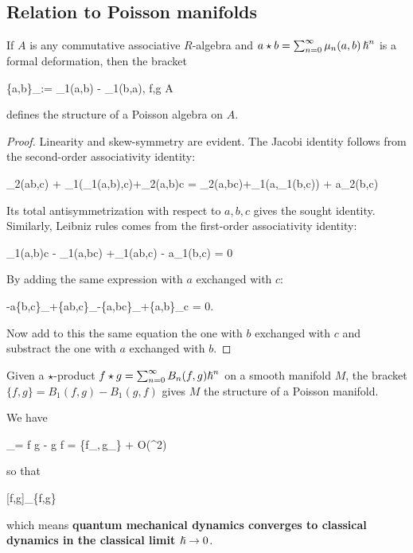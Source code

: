 \documentclass[main.tex]{subfiles}
\begin{document}
\subsection{Relation to Poisson manifolds}
\begin{proposition}
	If $A$ is any commutative associative $R$-algebra and $a \star b = \sum_{n=0}^\infty \mu_n(a,b)\,{\boldsymbol\hslash}^n$ is a formal deformation, then the bracket
	\begin{eqalign}
		\{a,b\}_\star := \mu_1(a,b) - \mu_1(b,a), \quad \forall f,g \in A
	\end{eqalign}
	defines the structure of a Poisson algebra on $A$.
\end{proposition}
\begin{proof}
	Linearity and skew-symmetry are evident. The Jacobi identity follows from the second-order associativity identity:
	\begin{eqalign}
		\mu_2(ab,c) + \mu_1(\mu_1(a,b),c)+\mu_2(a,b)c = \mu_2(a,bc)+\mu_1(a,\mu_1(b,c)) + a\mu_2(b,c)
	\end{eqalign}
	Its total antisymmetrization with respect to $a,b,c$ gives the sought identity. Similarly, Leibniz rules comes from the first-order associativity identity:
	\begin{eqalign}
		\mu_1(a,b)c - \mu_1(a,bc) +\mu_1(ab,c) - a\mu_1(b,c) = 0
	\end{eqalign}
	By adding the same expression with $a$ exchanged with $c$:
	\begin{eqalign}
		-a\{b,c\}_\star +\{ab,c\}_\star -\{a,bc\}_\star +\{a,b\}_\star c = 0.
	\end{eqalign}
	Now add to this the same equation the one with $b$ exchanged with $c$ and substract the one with $a$ exchanged with $b$.
\end{proof}
\begin{corollary}
	Given a $\star$-product $f \star g = \sum_{n=0}^\infty B_n(f,g){\boldsymbol\hslash}^n$ on a smooth manifold $M$, the bracket $\{f,g\} = B_1(f,g) - B_1(g,f)$ gives $M$ the structure of a Poisson manifold.
\end{corollary}

\begin{remark}
	We have
	\begin{eqalign}
		[f,g]_\star = f \star g - g \star f = \planck \{f\vert_{},\,g\vert_{}\} + O(\planck^2)
	\end{eqalign}
	so that
	\begin{eqalign}
		[f,g]_\star \conv[\planck \to 0] \{f,g\}
	\end{eqalign}
	which means \textbf{quantum mechanical dynamics converges to classical dynamics in the classical limit ${\boldsymbol\hslash} \to 0$}.
\end{remark}
\end{document}
